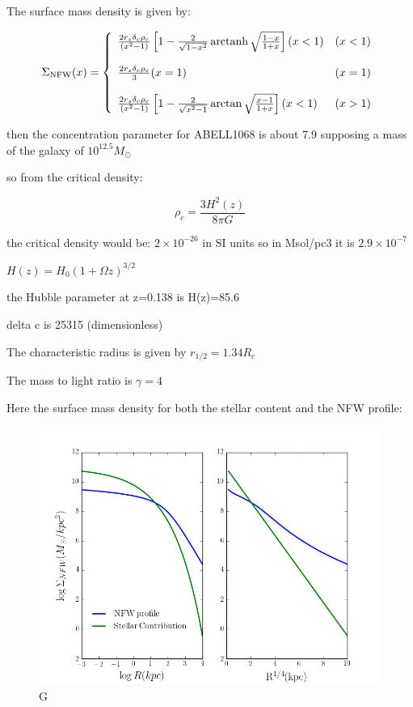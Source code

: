 The surface mass density is given by:

\begin{equation}
\Sigma_{\text{NFW}}(x) = \left\lbrace
\begin{array}{lll}
\frac{2r_{s}\delta_{c}\rho_{c}}{\left(x^{2}-1\right)}\left[1-\frac{2}{\sqrt{1-x^{2}}}\operatorname{arctanh}\sqrt{\frac{1-x}{1+x}}\right](x<1) & (x<1)\\\\
\frac{2r_{s}\delta_{c}\rho_{c}}{3}(x=1) & (x=1)\\\\
\frac{2r_{s}\delta_{c}\rho_{c}}{\left(x^{2}-1\right)}\left[1-\frac{2}{\sqrt{x^{2}-1}}\arctan\sqrt{\frac{x-1}{1+x}}\right](x<1) & (x>1)
\end{array}
\right.
\end{equation} 

then the concentration parameter for ABELL1068 is about 7.9 supposing a mass of the galaxy of $10^{12.5}M_{\odot}$

so from the critical density:

\begin{equation}
\rho_{c}=\frac{3H^2(z)}{8\pi G}
\end{equation}

the critical density would be: $2\times 10^{-26}$ in SI units so in Msol/pc3 it is $2.9\times 10^{-7}$

$H(z)=H_{0}(1+\Omega z)^{3/2}$

the Hubble parameter at z=0.138 is H(z)=85.6

delta c is 25315 (dimensionless)

The characteristic radius is given by $r_{1/2}=1.34R_{e}$

The mass to light ratio is $\gamma=4$

Here the surface mass density for both the stellar content and the NFW profile:

\begin{figure}[H]
\centering
\includegraphics[width=12cm]{images/Surface_mass_density_log.png}
\caption[M]{G}
\end{figure}

